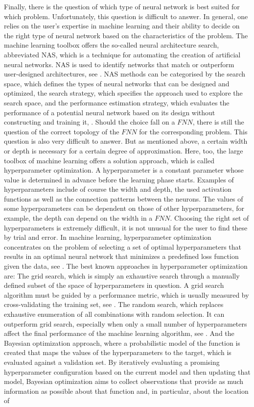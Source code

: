 Finally, there is the question of which type of neural network is best suited for which problem. Unfortunately, this question is difficult to answer. In general, one relies on the user's expertise in machine learning and their ability to decide on the right type of neural network based on the characteristics of the problem. The machine learning toolbox offers the so-called neural architecture search, abbreviated NAS, which is a technique for automating the creation of artificial neural networks. NAS is used to identify networks that match or outperform user-designed architectures, see \cite{ZophLe:2017}. NAS methods can be categorised by the search space, which defines the types of neural networks that can be designed and optimized, the search strategy, which specifies the approach used to explore the search space, and the performance estimation strategy, which evaluates the performance of a potential neural network based on its design without constructing and training it, \cite{ElskenMetzenHutter:2019}. Should the choice fall on a $FNN$, there is still the question of the correct topology of the $FNN$ for the corresponding problem. This question is also very difficult to answer. But as mentioned above, a certain width or depth is necessary for a certain degree of approximation. Here, too, the large toolbox of machine learning offers a solution approach, which is called hyperparameter optimization. A hyperparameter is a constant parameter whose value is determined in advance before the learning phase starts. Examples of hyperparameters include of course the width and depth, the used activation functions as well as the connection patterns between the neurons. The values of some hyperparameters can be dependent on those of other hyperparameters, for example, the depth can depend on the width in a $FNN$. Choosing the right set of hyperparameters is extremely difficult, it is not unusual for the user to find these by trial and error. In machine learning, hyperparameter optimization concentrates on the problem of selecting a set of optimal hyperparameters that results in an optimal neural network that minimizes a predefined loss function given the data, see \cite{ClaesenDeMoor:2015}. The best known approaches in hyperparameter optimization are: The grid search, which is simply an exhaustive search through a manually defined subset of the space of hyperparameters in question. A grid search algorithm must be guided by a performance metric, which is usually measured by cross-validating the training set, see \cite{HsuChangLin:2003}. The random search, which replaces exhaustive enumeration of all combinations with random selection. It can outperform grid search, especially when only a small number of hyperparameters affect the final performance of the machine learning algorithm, see \cite{BergstraBengio:2012}. And the Bayesian optimization approach, where a probabilistic model of the function is created that maps the values of the hyperparameters to the target, which is evaluated against a validation set. By iteratively evaluating a promising hyperparameter configuration based on the current model and then updating that model, Bayesian optimization aims to collect observations that provide as much information as possible about that function and, in particular, about the location of 